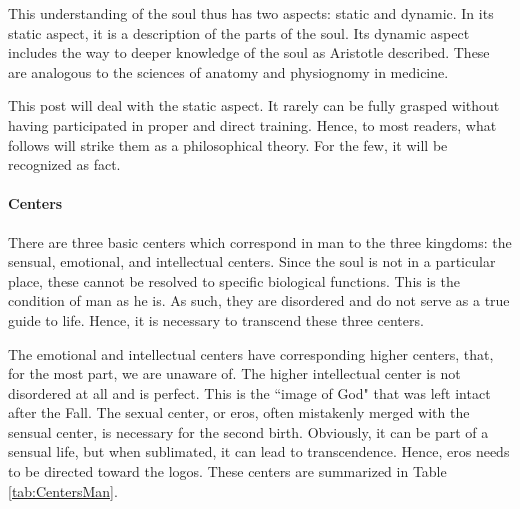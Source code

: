 This understanding of the soul thus has two aspects: static and dynamic. In its static aspect, it is a description of the parts of the soul. Its dynamic aspect includes the way to deeper knowledge of the soul as Aristotle described. These are analogous to the sciences of anatomy and physiognomy in medicine.

This post will deal with the static aspect. It rarely can be fully grasped without having participated in proper and direct training. Hence, to most readers, what follows will strike them as a philosophical theory. For the few, it will be recognized as fact.

\paragraph{Centers}
There are three basic centers which correspond in man to the three kingdoms: the sensual, emotional, and intellectual centers. Since the soul is not in a particular place, these cannot be resolved to specific biological functions. This is the condition of man as he is. As such, they are disordered and do not serve as a true guide to life. Hence, it is necessary to transcend these three centers.

The emotional and intellectual centers have corresponding higher centers, that, for the most part, we are unaware of. The higher intellectual center is not disordered at all and is perfect. This is the ``image of God" that was left intact after the Fall. The sexual center, or eros, often mistakenly merged with the sensual center, is necessary for the second birth. Obviously, it can be part of a sensual life, but when sublimated, it can lead to transcendence. Hence, eros needs to be directed toward the logos. These centers are summarized in Table \ref{tab:CentersMan}.

